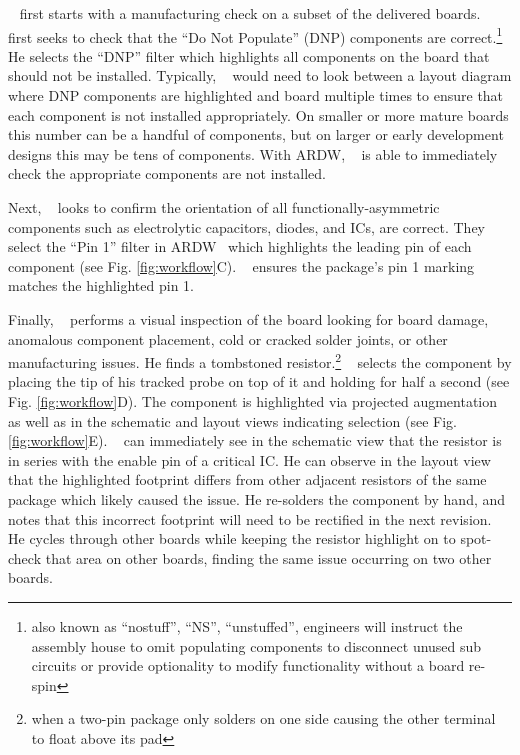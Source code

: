 \documentclass [11pt, proquest] {uwthesis}[2020/02/24]
\newcommand{\ARDWname}{ARDW}
\begin{document}
\personname~ first starts with a manufacturing check on a subset of the delivered boards. \personname~ first seeks to check that the ``Do Not Populate'' (DNP) components are correct.\footnote{also known as ``nostuff'', ``NS'', ``unstuffed'', engineers will instruct the assembly house to omit populating components to disconnect unused sub circuits or provide optionality to modify functionality without a board re-spin}
He selects the ``DNP'' filter which highlights all components on the board that should not be installed. Typically, \personname~ would need to look between a layout diagram where DNP components are highlighted and board multiple times to ensure that each component is not installed appropriately. On smaller or more mature boards this number can be a handful of components, but on larger or early development designs this may be tens of components. With \ARDWname, \personname~ is able to immediately check the appropriate components are not installed.

Next, \personname~ looks to confirm the orientation of all functionally-asymmetric components such as electrolytic capacitors, diodes, and ICs, are correct. They select the “Pin 1” filter in \ARDWname~ which highlights the leading pin of each component  (see Fig. \ref{fig:workflow}C). \personname~ ensures the package’s pin 1 marking matches the highlighted pin 1.

Finally, \personname~ performs a visual inspection of the board looking for board damage, anomalous component placement, cold or cracked solder joints, or other manufacturing issues. He finds a tombstoned resistor.\footnote{when a two-pin package only solders on one side causing the other terminal to float above its pad} \personname~ selects the component by placing the tip of his tracked probe on top of it and holding for half a second  (see Fig. \ref{fig:workflow}D). The component is highlighted via projected augmentation as well as in the schematic and layout views indicating selection  (see Fig. \ref{fig:workflow}E). \personname~ can immediately see in the schematic view that the resistor is in series with the enable pin of a critical IC. He can observe in the layout view that the highlighted footprint differs from other adjacent resistors of the same package which likely caused the issue. He re-solders the component by hand, and notes that this incorrect footprint will need to be rectified in the next revision. He cycles through other boards while keeping the resistor highlight on to spot-check that area on other boards, finding the same issue occurring on two other boards.
\end{document}
